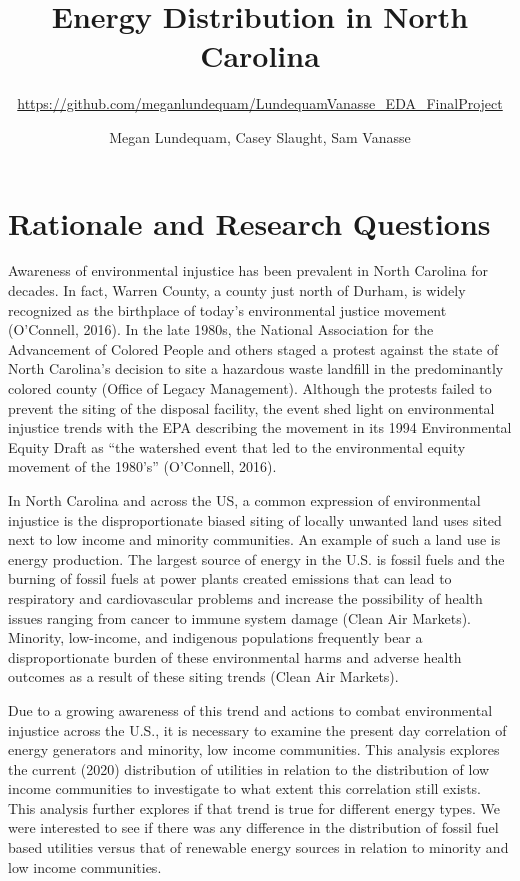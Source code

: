 \documentclass[
  12pt,
]{article}
\title{Energy Distribution in North Carolina}
\subtitle{\url{https://github.com/meganlundequam/LundequamVanasse_EDA_FinalProject}}
\author{Megan Lundequam, Casey Slaught, Sam Vanasse}
\date{}
\begin{document}
\maketitle

\newpage
\tableofcontents 
\newpage
\listoffigures 
\newpage

\hypertarget{rationale-and-research-questions}{%
\section{Rationale and Research
Questions}\label{rationale-and-research-questions}}

Awareness of environmental injustice has been prevalent in North
Carolina for decades. In fact, Warren County, a county just north of
Durham, is widely recognized as the birthplace of today's environmental
justice movement (O'Connell, 2016). In the late 1980s, the National
Association for the Advancement of Colored People and others staged a
protest against the state of North Carolina's decision to site a
hazardous waste landfill in the predominantly colored county (Office of
Legacy Management). Although the protests failed to prevent the siting
of the disposal facility, the event shed light on environmental
injustice trends with the EPA describing the movement in its 1994
Environmental Equity Draft as ``the watershed event that led to the
environmental equity movement of the 1980's'' (O'Connell, 2016).

In North Carolina and across the US, a common expression of
environmental injustice is the disproportionate biased siting of locally
unwanted land uses sited next to low income and minority communities. An
example of such a land use is energy production. The largest source of
energy in the U.S. is fossil fuels and the burning of fossil fuels at
power plants created emissions that can lead to respiratory and
cardiovascular problems and increase the possibility of health issues
ranging from cancer to immune system damage (Clean Air Markets).
Minority, low-income, and indigenous populations frequently bear a
disproportionate burden of these environmental harms and adverse health
outcomes as a result of these siting trends (Clean Air Markets).

Due to a growing awareness of this trend and actions to combat
environmental injustice across the U.S., it is necessary to examine the
present day correlation of energy generators and minority, low income
communities. This analysis explores the current (2020) distribution of
utilities in relation to the distribution of low income communities to
investigate to what extent this correlation still exists. This analysis
further explores if that trend is true for different energy types. We
were interested to see if there was any difference in the distribution
of fossil fuel based utilities versus that of renewable energy sources
in relation to minority and low income communities.
\end{document}
